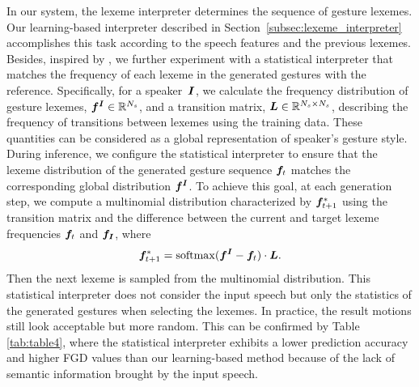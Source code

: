 In our system, the lexeme interpreter determines the sequence of gesture lexemes. Our learning-based interpreter described in Section~\ref{subsec:lexeme_interpreter} accomplishes this task according to the speech features and the previous lexemes. Besides, inspired by \cite{aristidou2021rhythm}, we further experiment with a statistical interpreter that matches the frequency of each lexeme in the generated gestures with the reference. Specifically, for a speaker~$\bm{I}$, we calculate the frequency distribution of gesture lexemes, $\bm{f}^{\bm{I}}\in\mathbb{R}^{N_s}$, and a transition matrix, $\bm{L}\in\mathbb{R}^{N_s\times{}N_s}$, describing the frequency of transitions between lexemes using the training data. These quantities can be considered as a global representation of speaker's gesture style. 
%
During inference, we configure the statistical interpreter to ensure that the lexeme distribution of the generated gesture sequence $\bm{f}_t$ matches the corresponding global distribution $\bm{f}^{\bm{I}}$. 
%
To achieve this goal, at each generation step, we compute a multinomial distribution characterized by $\bm{f}^*_{t+1}$ using the transition matrix and the difference between the current and target lexeme frequencies $\bm{f}_t$ and $\bm{f}_{\bm{I}}$, where
\begin{equation}
    \bm{f}^*_{t+1} = \operatorname*{softmax}(\bm{f}^{\bm{I}}-\bm{f}_t )
    \cdot \bm{L}.
\end{equation}
Then the next lexeme is sampled from the multinomial distribution.
%
This statistical interpreter does not consider the input speech but only the statistics of the generated gestures when selecting the lexemes. In practice, the result motions still look acceptable but more random. This can be confirmed by Table \ref{tab:table4}, where the statistical interpreter exhibits a lower prediction accuracy and higher FGD values than our learning-based method because of the lack of semantic information brought by the input speech.


